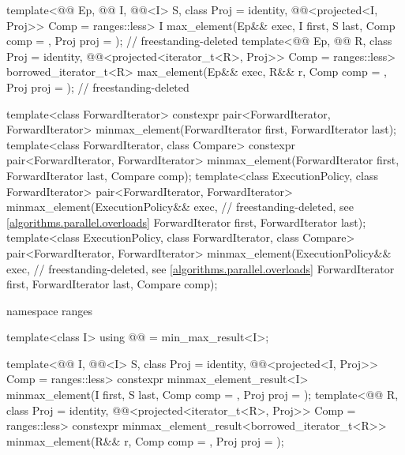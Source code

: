\begin{codeblock}
{{    template<@@ Ep, @@ I, @@<I> S,
             class Proj = identity,
             @@<projected<I, Proj>> Comp = ranges::less>
      I max_element(Ep&& exec, I first, S last, Comp comp = {},
                    Proj proj = {});                                        // freestanding-deleted
    template<@@ Ep, @@ R,
             class Proj = identity,
             @@<projected<iterator_t<R>, Proj>> Comp = ranges::less>
      borrowed_iterator_t<R>
        max_element(Ep&& exec, R&& r, Comp comp = {}, Proj proj = {});      // freestanding-deleted
  }

  template<class ForwardIterator>
    constexpr pair<ForwardIterator, ForwardIterator>
      minmax_element(ForwardIterator first, ForwardIterator last);
  template<class ForwardIterator, class Compare>
    constexpr pair<ForwardIterator, ForwardIterator>
      minmax_element(ForwardIterator first, ForwardIterator last, Compare comp);
  template<class ExecutionPolicy, class ForwardIterator>
    pair<ForwardIterator, ForwardIterator>
      minmax_element(ExecutionPolicy&& exec,                    // freestanding-deleted, see \ref{algorithms.parallel.overloads}
                     ForwardIterator first, ForwardIterator last);
  template<class ExecutionPolicy, class ForwardIterator, class Compare>
    pair<ForwardIterator, ForwardIterator>
      minmax_element(ExecutionPolicy&& exec,                    // freestanding-deleted, see \ref{algorithms.parallel.overloads}
                     ForwardIterator first, ForwardIterator last, Compare comp);

  namespace ranges {
    template<class I>
      using @@ = min_max_result<I>;

    template<@@ I, @@<I> S, class Proj = identity,
             @@<projected<I, Proj>> Comp = ranges::less>
      constexpr minmax_element_result<I>
        minmax_element(I first, S last, Comp comp = {}, Proj proj = {});
    template<@@ R, class Proj = identity,
             @@<projected<iterator_t<R>, Proj>> Comp = ranges::less>
      constexpr minmax_element_result<borrowed_iterator_t<R>>
        minmax_element(R&& r, Comp comp = {}, Proj proj = {});

}}
\end{codeblock}
